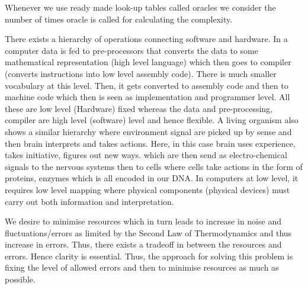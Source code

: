 \documentclass[12pt, oneside]{book}
\theoremstyle{definition}
\theoremstyle{definition}
\theoremstyle{remark}
\begin{document}
Whenever we use ready made look-up tables called oracles we consider the number of times oracle is called for calculating the complexity.

There exists a hierarchy of operations connecting software and hardware. In a computer data is fed to pre-processors that converts the data to some mathematical representation (high level language) which then goes to compiler (converts instructions into low level assembly code). There is much smaller vocabulary at this level. Then, it gets converted to assembly code and then to machine code which then is seen as implementation and programmer level. All these are low level (Hardware) fixed whereas the data and pre-processing, compiler are high level (software) level and hence flexible. A living organism also shows a similar hierarchy where environment signal are picked up by sense and then brain interprets and takes actions. Here, in this case brain uses experience, takes initiative, figures out new ways. which are then send as electro-chemical signals to the nervous systems then to cells where cells take actions in the form of proteins, enzymes which is all encoded in our DNA. In computers at low level, it requires low level mapping where physical components (physical devices) must carry out both information and interpretation. 

We desire to minimise resources which in turn leads to increase in noise and fluctuations/errors as limited by the Second Law of Thermodynamics and thus increase in errors. Thus, there exists a tradeoff in between the resources and errors. Hence clarity is essential. Thus, the approach for solving this problem is fixing the level of allowed errors and then to minimise resources as much as possible. 
\end{document}
